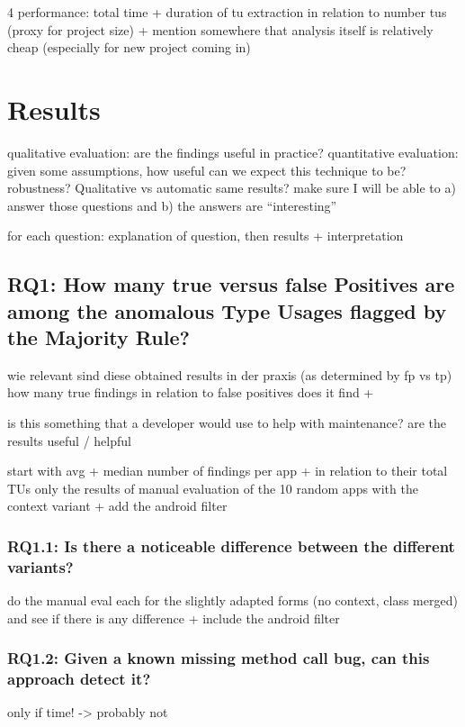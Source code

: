 4 performance:
    total time +
    duration of tu extraction in relation to number tus (proxy for project size)
    + mention somewhere that analysis itself is relatively cheap (especially for new project coming in)

\section{Results}

qualitative evaluation: are the findings useful in practice?
quantitative evaluation: given some assumptions, how useful can we expect this technique to be? robustness? Qualitative vs automatic same results?
make sure I will be able to a) answer those questions and b) the answers are ``interesting''

for each question: explanation of question, then results + interpretation

\subsection{RQ1: How many true versus false Positives are among the anomalous Type Usages flagged by the Majority Rule?}

wie relevant sind diese obtained results in der praxis (as determined by fp vs tp)
how many true findings in relation to false positives does it find + 

is this something that a developer would use to help with maintenance?
are the results useful / helpful

start with avg + median number of findings per app + in relation to their total TUs
only the results of manual evaluation of the 10 random apps with the context variant
+ add the android filter

\subsubsection{RQ1.1: Is there a noticeable difference between the different variants?}

do the manual eval each for the slightly adapted forms (no context, class merged) and see if there is any difference
+ include the android filter

\subsubsection{RQ1.2: Given a known missing method call bug, can this approach detect it?}
only if time! -> probably not

